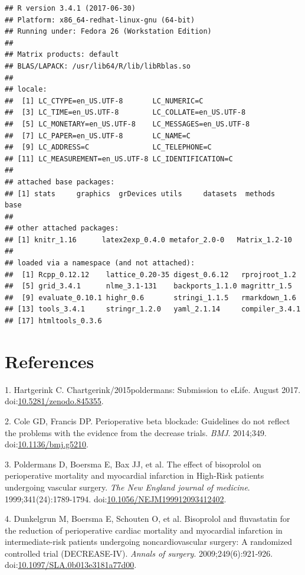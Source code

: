 \documentclass[]{article}
\begin{document}
\begin{verbatim}
## R version 3.4.1 (2017-06-30)
## Platform: x86_64-redhat-linux-gnu (64-bit)
## Running under: Fedora 26 (Workstation Edition)
## 
## Matrix products: default
## BLAS/LAPACK: /usr/lib64/R/lib/libRblas.so
## 
## locale:
##  [1] LC_CTYPE=en_US.UTF-8       LC_NUMERIC=C              
##  [3] LC_TIME=en_US.UTF-8        LC_COLLATE=en_US.UTF-8    
##  [5] LC_MONETARY=en_US.UTF-8    LC_MESSAGES=en_US.UTF-8   
##  [7] LC_PAPER=en_US.UTF-8       LC_NAME=C                 
##  [9] LC_ADDRESS=C               LC_TELEPHONE=C            
## [11] LC_MEASUREMENT=en_US.UTF-8 LC_IDENTIFICATION=C       
## 
## attached base packages:
## [1] stats     graphics  grDevices utils     datasets  methods   base     
## 
## other attached packages:
## [1] knitr_1.16      latex2exp_0.4.0 metafor_2.0-0   Matrix_1.2-10  
## 
## loaded via a namespace (and not attached):
##  [1] Rcpp_0.12.12    lattice_0.20-35 digest_0.6.12   rprojroot_1.2  
##  [5] grid_3.4.1      nlme_3.1-131    backports_1.1.0 magrittr_1.5   
##  [9] evaluate_0.10.1 highr_0.6       stringi_1.1.5   rmarkdown_1.6  
## [13] tools_3.4.1     stringr_1.2.0   yaml_2.1.14     compiler_3.4.1 
## [17] htmltools_0.3.6
\end{verbatim}

\section*{References}\label{references}

\hypertarget{refs}{}
\hypertarget{ref-chris_hartgerink_2017_845355}{}
1. Hartgerink C. Chartgerink/2015poldermans: Submission to eLife. August
2017.
doi:\href{https://doi.org/10.5281/zenodo.845355}{10.5281/zenodo.845355}.

\hypertarget{ref-Coleg5210}{}
2. Cole GD, Francis DP. Perioperative beta blockade: Guidelines do not
reflect the problems with the evidence from the decrease trials.
\emph{BMJ}. 2014;349.
doi:\href{https://doi.org/10.1136/bmj.g5210}{10.1136/bmj.g5210}.

\hypertarget{ref-poldermans1999}{}
3. Poldermans D, Boersma E, Bax JJ, et al. The effect of bisoprolol on
perioperative mortality and myocardial infarction in High-Risk patients
undergoing vascular surgery. \emph{The New England journal of medicine}.
1999;341(24):1789-1794.
doi:\href{https://doi.org/10.1056/NEJM199912093412402}{10.1056/NEJM199912093412402}.

\hypertarget{ref-dunkelgrun2009}{}
4. Dunkelgrun M, Boersma E, Schouten O, et al. Bisoprolol and
fluvastatin for the reduction of perioperative cardiac mortality and
myocardial infarction in intermediate-risk patients undergoing
noncardiovascular surgery: A randomized controlled trial (DECREASE-IV).
\emph{Annals of surgery}. 2009;249(6):921-926.
doi:\href{https://doi.org/10.1097/SLA.0b013e3181a77d00}{10.1097/SLA.0b013e3181a77d00}.
\end{document}
